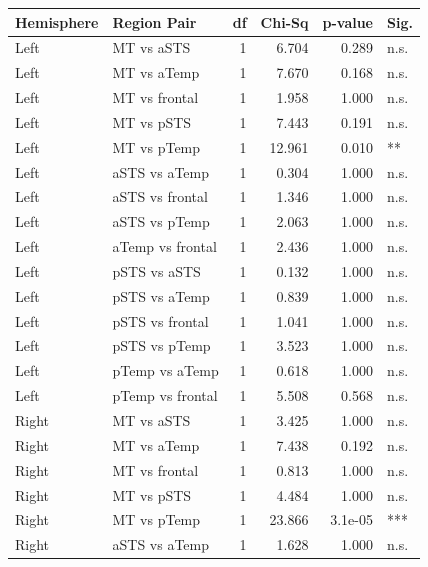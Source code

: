 \begin{table}[h]
\centering
\begin{tabular}{llrrrl}
\toprule
 Hemisphere   & Region Pair      &   df &   Chi-Sq &   p-value & Sig.   \\
\midrule
 Left         & MT vs aSTS       &    1 &    6.704 &     0.289 & n.s.   \\
 Left         & MT vs aTemp      &    1 &    7.670 &     0.168 & n.s.   \\
 Left         & MT vs frontal    &    1 &    1.958 &     1.000 & n.s.   \\
 Left         & MT vs pSTS       &    1 &    7.443 &     0.191 & n.s.   \\
 Left         & MT vs pTemp      &    1 &   12.961 &     0.010 & **     \\
 Left         & aSTS vs aTemp    &    1 &    0.304 &     1.000 & n.s.   \\
 Left         & aSTS vs frontal  &    1 &    1.346 &     1.000 & n.s.   \\
 Left         & aSTS vs pTemp    &    1 &    2.063 &     1.000 & n.s.   \\
 Left         & aTemp vs frontal &    1 &    2.436 &     1.000 & n.s.   \\
 Left         & pSTS vs aSTS     &    1 &    0.132 &     1.000 & n.s.   \\
 Left         & pSTS vs aTemp    &    1 &    0.839 &     1.000 & n.s.   \\
 Left         & pSTS vs frontal  &    1 &    1.041 &     1.000 & n.s.   \\
 Left         & pSTS vs pTemp    &    1 &    3.523 &     1.000 & n.s.   \\
 Left         & pTemp vs aTemp   &    1 &    0.618 &     1.000 & n.s.   \\
 Left         & pTemp vs frontal &    1 &    5.508 &     0.568 & n.s.   \\
 Right        & MT vs aSTS       &    1 &    3.425 &     1.000 & n.s.   \\
 Right        & MT vs aTemp      &    1 &    7.438 &     0.192 & n.s.   \\
 Right        & MT vs frontal    &    1 &    0.813 &     1.000 & n.s.   \\
 Right        & MT vs pSTS       &    1 &    4.484 &     1.000 & n.s.   \\
 Right        & MT vs pTemp      &    1 &   23.866 &   3.1e-05 & ***    \\
 Right        & aSTS vs aTemp    &    1 &    1.628 &     1.000 & n.s.   \\

\end{tabular}
\end{table}
